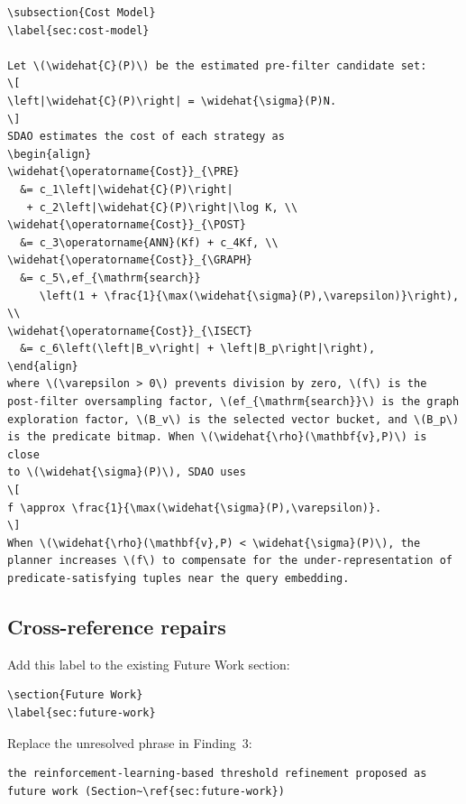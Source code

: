 \documentclass[11pt]{article}
\newcommand{\PRE}{\textsc{PRE}}
\newcommand{\POST}{\textsc{POST}}
\newcommand{\GRAPH}{\textsc{GRAPH}}
\newcommand{\ISECT}{\textsc{ISECT}}
\begin{document}
\begin{verbatim}
\subsection{Cost Model}
\label{sec:cost-model}

Let \(\widehat{C}(P)\) be the estimated pre-filter candidate set:
\[
\left|\widehat{C}(P)\right| = \widehat{\sigma}(P)N.
\]
SDAO estimates the cost of each strategy as
\begin{align}
\widehat{\operatorname{Cost}}_{\PRE}
  &= c_1\left|\widehat{C}(P)\right|
   + c_2\left|\widehat{C}(P)\right|\log K, \\
\widehat{\operatorname{Cost}}_{\POST}
  &= c_3\operatorname{ANN}(Kf) + c_4Kf, \\
\widehat{\operatorname{Cost}}_{\GRAPH}
  &= c_5\,ef_{\mathrm{search}}
     \left(1 + \frac{1}{\max(\widehat{\sigma}(P),\varepsilon)}\right), \\
\widehat{\operatorname{Cost}}_{\ISECT}
  &= c_6\left(\left|B_v\right| + \left|B_p\right|\right),
\end{align}
where \(\varepsilon > 0\) prevents division by zero, \(f\) is the
post-filter oversampling factor, \(ef_{\mathrm{search}}\) is the graph
exploration factor, \(B_v\) is the selected vector bucket, and \(B_p\)
is the predicate bitmap. When \(\widehat{\rho}(\mathbf{v},P)\) is close
to \(\widehat{\sigma}(P)\), SDAO uses
\[
f \approx \frac{1}{\max(\widehat{\sigma}(P),\varepsilon)}.
\]
When \(\widehat{\rho}(\mathbf{v},P) < \widehat{\sigma}(P)\), the
planner increases \(f\) to compensate for the under-representation of
predicate-satisfying tuples near the query embedding.
\end{verbatim}

\subsection*{Cross-reference repairs}

Add this label to the existing Future Work section:

\begin{verbatim}
\section{Future Work}
\label{sec:future-work}
\end{verbatim}

Replace the unresolved phrase in Finding~3:

\begin{verbatim}
the reinforcement-learning-based threshold refinement proposed as
future work (Section~\ref{sec:future-work})
\end{verbatim}
\end{document}
